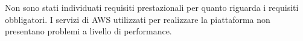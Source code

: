 
Non sono stati individuati requisiti prestazionali per quanto riguarda i requisiti obbligatori. I servizi di AWS utilizzati per realizzare la piattaforma non presentano problemi a livello di performance. 
